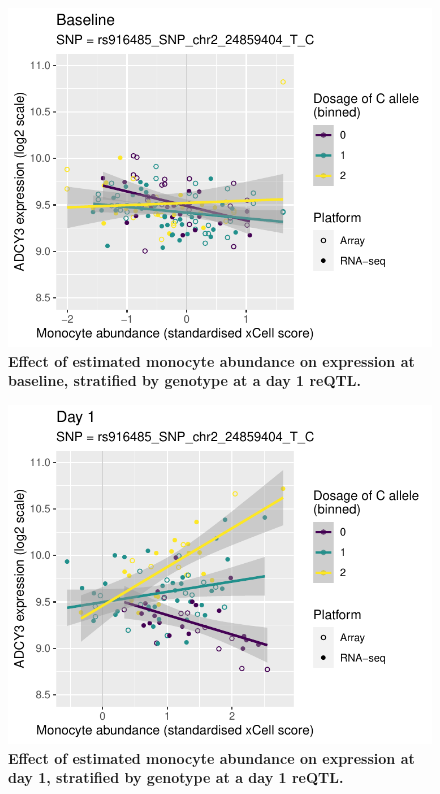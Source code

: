 \begin{figure}
    \centering
    \includegraphics[width=1.0\textwidth,page=1]{mainmatter/figures/chapter_03/lme4qtl.ENSG00000138031_Monocyte_baseline.pdf}
    \caption[
    ]{
        \textbf{Effect of estimated monocyte abundance on  expression at baseline, stratified by genotype at a day 1  \gls{reQTL}.}
    }
    \label{fig:hird_reQTL_ADCY3_vs_monocyte_baseline}
\end{figure}

\begin{figure}
    \centering
    \includegraphics[width=1.0\textwidth,page=1]{mainmatter/figures/chapter_03/lme4qtl.ENSG00000138031_Monocyte_day1.pdf}
    \caption[
    ]{
        \textbf{Effect of estimated monocyte abundance on  expression at day 1, stratified by genotype at a day 1  \gls{reQTL}.}
    }
    \label{fig:hird_reQTL_ADCY3_vs_monocyte_day1}
\end{figure}

